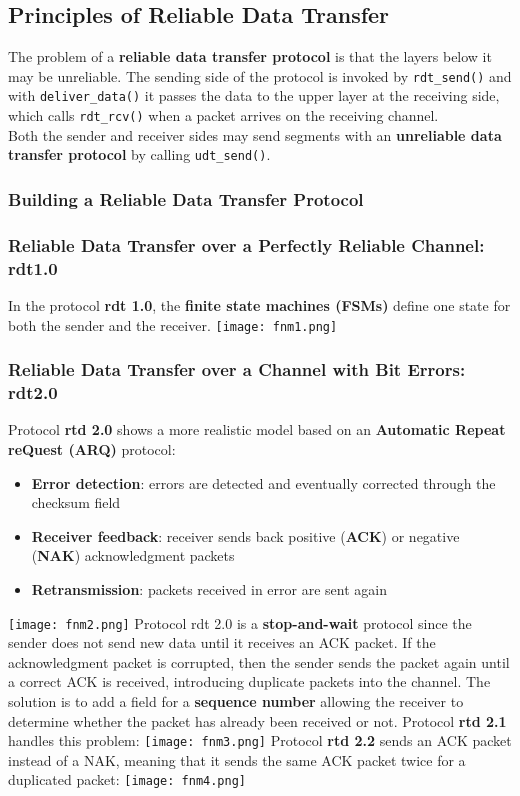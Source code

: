 \documentclass{article}
\begin{document}
\subsection{Principles of Reliable Data Transfer}
The problem of a \textbf{reliable data transfer protocol} is that the layers below it may be unreliable.
The sending side of the protocol is invoked by \verb|rdt_send()| and with \verb|deliver_data()| it passes the data to the upper layer at the receiving side, which calls \verb|rdt_rcv()| when a packet arrives on the receiving channel. \\
Both the sender and receiver sides may send segments with an \textbf{unreliable data transfer protocol} by calling \verb|udt_send()|.
\subsubsection{Building a Reliable Data Transfer Protocol}
\subsubsection*{Reliable Data Transfer over a Perfectly Reliable Channel: rdt1.0}
In the protocol \textbf{rdt 1.0}, the \textbf{finite state machines (FSMs)} define one state for both the sender and the receiver.
\texttt{[image: fnm1.png]}
\subsubsection*{Reliable Data Transfer over a Channel with Bit Errors: rdt2.0}
Protocol \textbf{rtd 2.0} shows a more realistic model based on an \textbf{Automatic Repeat reQuest (ARQ)} protocol:
\begin{itemize}
    \item \textbf{Error detection}: errors are detected and eventually corrected through the checksum field
    \item \textbf{Receiver feedback}: receiver sends back positive (\textbf{ACK}) or negative (\textbf{NAK}) acknowledgment packets
    \item \textbf{Retransmission}: packets received in error are sent again
\end{itemize}
\texttt{[image: fnm2.png]}
Protocol rdt 2.0 is a \textbf{stop-and-wait} protocol since the sender does not send new data until it receives an ACK packet.
If the acknowledgment packet is corrupted, then the sender sends the packet again until a correct ACK is received, introducing duplicate packets into the channel. The solution is to add a field for a \textbf{sequence number} allowing the receiver to determine whether the packet has already been received or not.
Protocol \textbf{rtd 2.1} handles this problem:
\texttt{[image: fnm3.png]}
Protocol \textbf{rtd 2.2} sends an ACK packet instead of a NAK, meaning that it sends the same ACK packet twice for a duplicated packet:
\texttt{[image: fnm4.png]}
\end{document}
